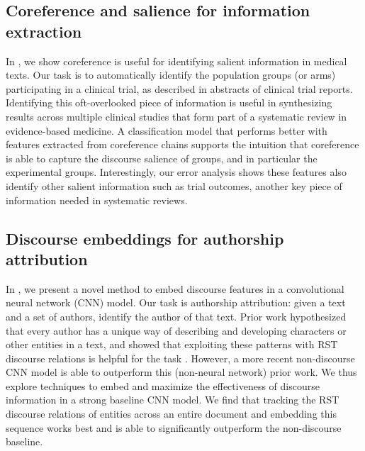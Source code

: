 \subsection{Coreference and salience for information extraction} 
In , we show coreference is useful for identifying salient information in medical texts. Our task is to automatically identify the population groups (or arms) participating in a clinical trial, as described in abstracts of clinical trial reports. Identifying this oft-overlooked piece of information is useful in synthesizing results across multiple clinical studies that form part of a systematic review in evidence-based medicine. A classification model that performs better with features extracted from coreference chains supports the intuition that coreference is able to capture the discourse salience of groups, and in particular the experimental groups. Interestingly, our error analysis shows these features also identify other salient information such as trial outcomes, another key piece of information needed in systematic reviews.

\subsection{Discourse embeddings for authorship attribution}
In , we present a novel method to embed discourse features in a convolutional neural network (CNN) model. Our task is authorship attribution: given a text and a set of authors, identify the author of that text. Prior work hypothesized that every author has a unique way of describing and developing characters or other entities in a text, and showed that exploiting these patterns with RST discourse relations is helpful for the task \cite{Feng:2014}. However, a more recent non-discourse CNN model is able to outperform this (non-neural network) prior work. We thus explore techniques to embed and maximize the effectiveness of discourse information in a strong baseline CNN model.
We find that tracking the RST discourse relations of entities across an entire document and embedding this sequence works best and is able to significantly outperform the non-discourse baseline.

